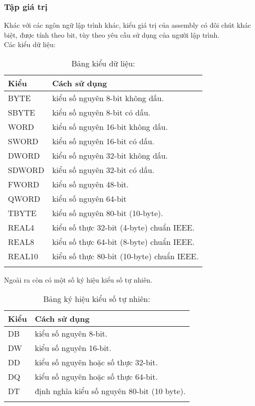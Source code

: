 		\subsubsection{Tập giá trị}
		Khác với các ngôn ngữ lập trình khác, kiểu giá trị của assembly có đôi chút khác biệt, được tính theo bit, tùy theo yêu cầu sử dụng của người lập trình. \\
		Các kiểu dữ liệu:
		\begin{longtable}{ | m{3cm} | m{8cm} | }
			\hline
				Kiểu & Cách sử dụng\\
			\hline
			\hline
				BYTE & 	kiểu số nguyên 8-bit không dấu.\\
			\hline
				SBYTE	& kiểu số nguyên 8-bit có dấu.\\
			\hline
				WORD& 	kiểu số nguyên 16-bit không dấu.\\
			\hline
				SWORD	& kiểu số nguyên 16-bit có dấu.\\
			\hline
				DWORD& 	kiểu số nguyên 32-bit không dấu.\\
			\hline
				SDWORD& 	kiểu số nguyên 32-bit có dấu.\\
			\hline
				FWORD	& kiểu số nguyên 48-bit.\\
			\hline
				QWORD& 	kiểu số nguyên 64-bit\\
			\hline
				TBYTE& 	kiểu số nguyên 80-bit (10-byte).\\
			\hline
				REAL4& 	kiểu số thực 32-bit (4-byte) chuẩn IEEE.\\
			\hline
				REAL8& 	kiểu số thực 64-bit (8-byte) chuẩn IEEE.\\
			\hline
				REAL10& 	kiểu số thực 80-bit (10-byte) chuẩn IEEE.\\			
			\hline
					\caption{Bảng kiểu dữ liệu:}
					\label{table:tbkieudulieu}
		\end{longtable}
		
		Ngoài ra còn có một số ký hiệu kiểu số tự nhiên.
		\begin{longtable}{ | m{3cm} | m{8cm} | }
			\hline
				Kiểu & Cách sử dụng\\
			\hline
			\hline
				DB &	kiểu số nguyên 8-bit.\\
			\hline
				DW &	kiểu số nguyên 16-bit.\\
			\hline			
				DD &	kiểu số nguyên hoặc số thực 32-bit.\\
			\hline
				DQ	 &kiểu số nguyên hoặc số thực 64-bit.\\
			\hline
				DT	 &định nghĩa kiểu số nguyên 80-bit (10 byte).\\
			\hline
					\caption{Bảng ký hiệu kiểu số tự nhiên:}
					\label{table:tbkieudulieutn}
		\end{longtable}
		
